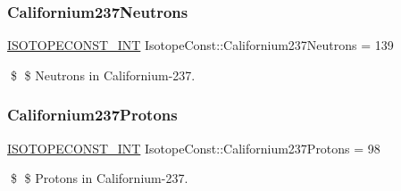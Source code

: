 \subsubsection{\texorpdfstring{Californium237\+Neutrons}{Californium237Neutrons}}
{\footnotesize\ttfamily \mbox{\hyperlink{group___isotope_const-_macros_ga5f18360b3e99483a35c32d789e62621c}{I\+S\+O\+T\+O\+P\+E\+C\+O\+N\+S\+T\+\_\+\+I\+NT}} Isotope\+Const\+::\+Californium237\+Neutrons = 139}

\$ \$ Neutrons in Californium-\/237. \mbox{\label{group___isotope_const-_californium-_cf237_gafd4078f360a21f8406e03a3c21adbc9d}} 
\subsubsection{\texorpdfstring{Californium237\+Protons}{Californium237Protons}}
{\footnotesize\ttfamily \mbox{\hyperlink{group___isotope_const-_macros_ga5f18360b3e99483a35c32d789e62621c}{I\+S\+O\+T\+O\+P\+E\+C\+O\+N\+S\+T\+\_\+\+I\+NT}} Isotope\+Const\+::\+Californium237\+Protons = 98}

\$ \$ Protons in Californium-\/237. 